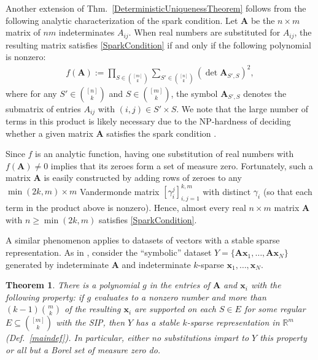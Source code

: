 \documentclass[9pt,twocolumn]{pnas-new}
\newtheorem{theorem}{Theorem}
\begin{document}
Another extension of Thm.~\ref{DeterministicUniquenessTheorem} follows from the following analytic characterization of the spark condition.  Let $\mathbf{A}$  be the $n \times m$ matrix of $nm$ indeterminates $A_{ij}$. When real numbers are substituted for $A_{ij}$, the resulting matrix satisfies \eqref{SparkCondition} if and only if the following polynomial is nonzero:
\begin{align*}
f(\mathbf{A}) := \prod_{S \in {[m] \choose k}} \sum_{S' \in {[n] \choose k}} (\det \mathbf{A}_{S',S})^2,
\end{align*}
%
where for any $S' \in {[n] \choose k}$ and $S \in {[m] \choose k}$, the symbol $\mathbf{A}_{S',S}$ denotes the submatrix of entries $A_{ij}$ with $(i,j) \in S' \times S$.   We note that the large number of terms in this product is likely necessary due to the NP-hardness of deciding whether a given matrix $\mathbf{A}$ satisfies the spark condition \cite{tillmann2014computational}.

Since $f$ is an analytic function, having one substitution of real numbers with $f(\mathbf{A}) \neq 0$ implies that its zeroes form a set of measure zero. Fortunately, such a matrix $\mathbf{A}$ is easily constructed by adding rows of zeroes to any $\min(2k,m) \times m$ Vandermonde matrix $[\gamma_i^j]_{i,j=1}^{k,m}$ with distinct $\gamma_i$ (so that each term in the product above is nonzero).
Hence, almost every real $n \times m$ matrix $\mathbf{A}$ with $n \geq \min(2k,m)$ satisfies \eqref{SparkCondition}.

A similar phenomenon applies to datasets of vectors with a stable sparse representation. As in \cite[Sec.~IV]{Hillar15}, consider the ``symbolic'' dataset $Y = \{\mathbf{A}\mathbf{x}_1,\ldots,\mathbf{A} \mathbf{x}_N\}$ generated by indeterminate $\mathbf{A}$ and indeterminate $k$-sparse $\mathbf{x}_1, \ldots, \mathbf{x}_N$.  

\begin{theorem}\label{robustPolythm}
There is a polynomial $g$ in the entries of $\mathbf{A}$ and $\mathbf{x}_i$ with the following property:  if $g$ evaluates to a nonzero number and more than \mbox{$(k-1){m \choose k}$} of the resulting $\mathbf{x}_i$ are supported on each $S \in E$ for some regular $E \subseteq {[m] \choose k}$ with the SIP, then $Y$ has a stable $k$-sparse representation in $\mathbb{R}^m$ (Def.~\ref{maindef}). In particular, either no substitutions impart to $Y$ this property or all but a Borel set of measure zero do.
\end{theorem}
\end{document}
